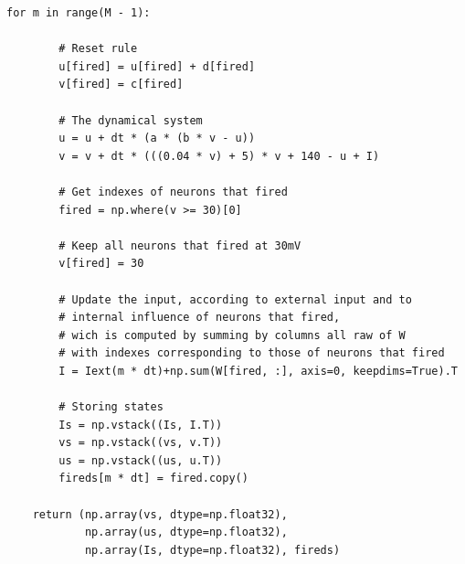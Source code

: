 \documentclass[12pt]{scrartcl}
\begin{document}
\begin{lstlisting}[caption = {Numpy vs Tensorflow : Implémentation Numpy}]
    for m in range(M - 1):

        # Reset rule
        u[fired] = u[fired] + d[fired]
        v[fired] = c[fired]

        # The dynamical system
        u = u + dt * (a * (b * v - u))
        v = v + dt * (((0.04 * v) + 5) * v + 140 - u + I)

        # Get indexes of neurons that fired
        fired = np.where(v >= 30)[0]

        # Keep all neurons that fired at 30mV
        v[fired] = 30

        # Update the input, according to external input and to
        # internal influence of neurons that fired, 
        # wich is computed by summing by columns all raw of W
        # with indexes corresponding to those of neurons that fired
        I = Iext(m * dt)+np.sum(W[fired, :], axis=0, keepdims=True).T

        # Storing states
        Is = np.vstack((Is, I.T))
        vs = np.vstack((vs, v.T))
        us = np.vstack((us, u.T))
        fireds[m * dt] = fired.copy()

    return (np.array(vs, dtype=np.float32),
            np.array(us, dtype=np.float32),
            np.array(Is, dtype=np.float32), fireds)

\end{lstlisting}
\end{document}

